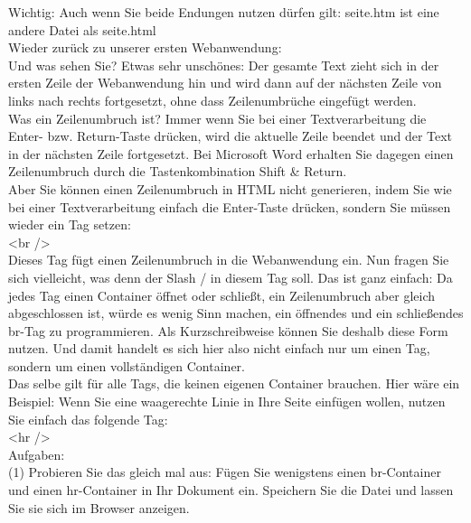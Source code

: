 Wichtig: Auch wenn Sie beide Endungen nutzen dürfen gilt: seite.htm ist eine andere Datei als seite.html\\

Wieder zurück zu unserer ersten Webanwendung:\\

Und was sehen Sie? Etwas sehr unschönes: Der gesamte Text zieht sich in der ersten Zeile der Webanwendung hin und wird dann auf der nächsten Zeile von links nach rechts fortgesetzt, ohne dass Zeilenumbrüche eingefügt werden.\\

Was ein Zeilenumbruch ist? Immer wenn Sie bei einer Textverarbeitung die Enter- bzw. Return-Taste drücken, wird die aktuelle Zeile beendet und der Text in der nächsten Zeile fortgesetzt. Bei Microsoft Word erhalten Sie dagegen einen Zeilenumbruch durch die Tastenkombination Shift \& Return.\\

Aber Sie können einen Zeilenumbruch in HTML nicht generieren, indem Sie wie bei einer Textverarbeitung einfach die Enter-Taste drücken, sondern Sie müssen wieder ein Tag setzen:\\

<br />\\

Dieses Tag fügt einen Zeilenumbruch in die Webanwendung ein. Nun fragen Sie sich vielleicht, was denn der Slash / in diesem Tag soll. Das ist ganz einfach: Da jedes Tag einen Container öffnet oder schließt, ein Zeilenumbruch aber gleich abgeschlossen ist, würde es wenig Sinn machen, ein öffnendes und ein schließendes br-Tag zu programmieren. Als Kurzschreibweise können Sie deshalb diese Form nutzen. Und damit handelt es sich hier also nicht einfach nur um einen Tag, sondern um einen vollständigen Container.\\

Das selbe gilt für alle Tags, die keinen eigenen Container brauchen. Hier wäre ein Beispiel: Wenn Sie eine waagerechte Linie in Ihre Seite einfügen wollen, nutzen Sie einfach das folgende Tag:\\

<hr />\\

Aufgaben: \\

(1)	Probieren Sie das gleich mal aus: Fügen Sie wenigstens einen br-Container und einen hr-Container in Ihr Dokument ein. Speichern Sie die Datei und lassen Sie sie sich im Browser anzeigen.

